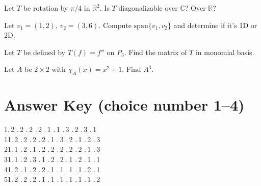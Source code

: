 \documentclass[11pt]{article}
\begin{document}
\begin{problem}
Let $T$ be rotation by $\pi/4$ in $\mathbb{R}^2$. Is $T$ diagonalizable over $\mathbb{C}$? Over $\mathbb{R}$?
\end{problem}

\begin{problem}
Let $v_1 = (1,2)$, $v_2 = (3,6)$. Compute $\mathrm{span}\{v_1,v_2\}$ and determine if it's 1D or 2D.
\end{problem}

\begin{problem}
Let $T$ be defined by $T(f) = f''$ on $P_3$. Find the matrix of $T$ in monomial basis.
\end{problem}

\begin{problem}
Let $A$ be $2\times 2$ with $\chi_A(x) = x^2 + 1$. Find $A^4$.
\end{problem}
\section*{Answer Key (choice number 1–4)}
\begin{flushleft}
1.\,2 .\,2 .\,2 .\,2 .\,1 .\,1 .\,3 .\,2 .\,3 .\,1\\
11.\,2 .\,2 .\,2 .\,2 .\,1 .\,3 .\,2 .\,1 .\,2 .\,3\\
21.\,1 .\,2 .\,1 .\,2 .\,2 .\,2 .\,2 .\,2 .\,1 .\,3\\
31.\,1 .\,2 .\,3 .\,1 .\,2 .\,2 .\,1 .\,2 .\,1 .\,1\\
41.\,2 .\,1 .\,2 .\,2 .\,1 .\,1 .\,1 .\,1 .\,2 .\,1\\
51.\,2 .\,2 .\,2 .\,1 .\,1 .\,1 .\,1 .\,1 .\,1 .\,2
\end{flushleft}
\end{document}
